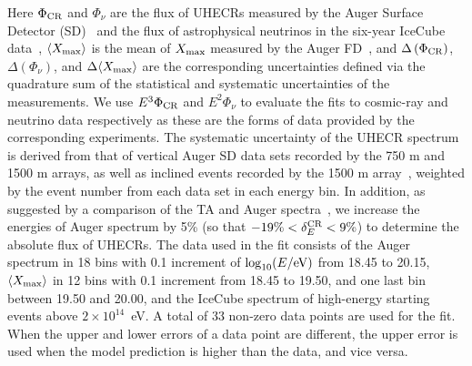 \documentclass[aps,prd,onecolumn,superscriptaddress,11pt]{revtex4}
\begin{document}
Here $\Phi_{\rm CR}$ and  $\Phi_\nu$ are the flux of UHECRs measured by the Auger Surface Detector (SD)~\cite{Aab:2015bza} and the flux of astrophysical neutrinos in the six-year IceCube data~\cite{Aartsen:2016xlq2}, $\langle X_{\rm max}\rangle$ is the mean of $X_{\rm max}$ measured by the Auger FD~\cite{2014PhRvD..90l2005A, Aab:2015bza}, and $\Delta \left(\Phi_{\rm CR}\right)$, $\Delta \left(\Phi_\nu\right)$, and $\Delta \langle X_{\rm max}\rangle$ are the corresponding uncertainties defined via the quadrature sum of the statistical and systematic uncertainties of the measurements. We use $E^3\Phi_{\rm CR}$ and $E^2\Phi_\nu$ to evaluate the fits to cosmic-ray and neutrino data respectively as these are the forms of data provided by the corresponding experiments. The systematic uncertainty of the UHECR spectrum is derived from that of vertical Auger SD data sets recorded by the 750 m and 1500 m arrays, as well as inclined events recorded by the 1500 m array~\cite{Aab:2015bza}, weighted by the event number from each data set in each energy bin. In addition, as suggested by a comparison of the TA and Auger spectra~\cite{2017arXiv170509111V}, we increase the energies of Auger spectrum by 5\% (so that $-19\% <\delta_E^{\rm CR} < 9\%$) to determine the absolute flux of UHECRs. The data used in the fit consists of the Auger spectrum in 18 bins with 0.1 increment of $\log_{10}(E/\rm eV)$ from 18.45 to 20.15, $\langle X_{\rm max}\rangle$ in 12 bins with 0.1 increment from 18.45 to 19.50, and one last bin between 19.50 and 20.00, and the IceCube spectrum of high-energy starting events above $2\times{10}^{14}$~eV. A total of 33 non-zero data points are used for the fit. When the upper and lower errors of a data point are different, the upper error is used when the model prediction is higher than the data, and vice versa. 
\end{document}
